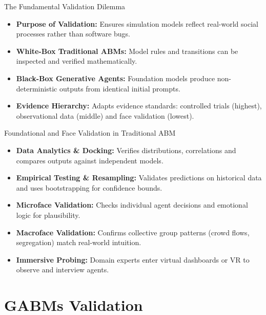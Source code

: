 \documentclass{beamer}
\begin{document}
\begin{frame}{The Fundamental Validation Dilemma}
\begin{itemize}
    \item \textbf{Purpose of Validation:} Ensures simulation models reflect real-world social processes rather than software bugs.
    \medskip
    \item \textbf{White-Box Traditional ABMs:} Model rules and transitions can be inspected and verified mathematically.
    \medskip
    \item \textbf{Black-Box Generative Agents:} Foundation models produce non-deterministic outputs from identical initial prompts.
    \medskip
    \item \textbf{Evidence Hierarchy:} Adapts evidence standards: controlled trials (highest), observational data (middle) and face validation (lowest).
\end{itemize}
\end{frame}

\begin{frame}{Foundational and Face Validation in Traditional ABM}
\begin{itemize}
    \item \textbf{Data Analytics \& Docking:} Verifies distributions, correlations and compares outputs against independent models.
    \medskip
    \item \textbf{Empirical Testing \& Resampling:} Validates predictions on historical data and uses bootstrapping for confidence bounds.
    \medskip
    \item \textbf{Microface Validation:} Checks individual agent decisions and emotional logic for plausibility.
    \medskip
    \item \textbf{Macroface Validation:} Confirms collective group patterns (crowd flows, segregation) match real-world intuition.
    \medskip
    \item \textbf{Immersive Probing:} Domain experts enter virtual dashboards or VR to observe and interview agents.
\end{itemize}
\end{frame}

\section{GABMs Validation}
\end{document}
